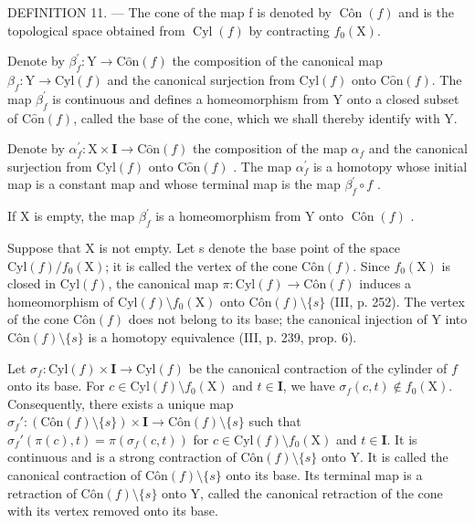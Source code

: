 DEFINITION 11. --- The cone of the map f is denoted by \(\operatorname{Côn}(f)\) and is the topological space obtained from \(\operatorname{Cyl}(f)\) by contracting \(f_{0}(\mathrm{X})\).

Denote by \(\beta_{f}^{\prime}\colon\mathrm{Y}\to\mathrm{C}\hat{\mathrm{o}}\mathrm{n}(f)\) the composition of the canonical map \(\beta_{f}\colon\mathrm{Y}\to\mathrm{C}\mathrm{y}\mathrm{l}(f)\) and the canonical surjection from \(\mathrm{C}\mathrm{y}\mathrm{l}(f)\) onto \(\mathrm{C}\hat{\mathrm{o}}\mathrm{n}(f)\). The map \(\beta_{f}^{\prime}\) is continuous and defines a homeomorphism from Y onto a closed subset of \(\mathrm{C}\hat{\mathrm{o}}\mathrm{n}(f)\), called the base of the cone, which we shall thereby identify with Y.

Denote by \(\alpha_{f}^{\prime}\colon\mathrm{X}\times\mathbf{I}\to\mathrm{C}\hat{\mathrm{o}}\mathrm{n}(f)\) the composition of the map \(\alpha_{f}\) and the canonical surjection from \(\mathrm{Cyl}(f)\) onto \(\mathrm{C}\hat{\mathrm{o}}\mathrm{n}(f)\) . The map \(\alpha_{f}^{\prime}\) is a homotopy whose initial map is a constant map and whose terminal map is the map \(\beta_{f}^{\prime}\circ f\) .

If X is empty, the map \(\beta_{f}^{\prime}\) is a homeomorphism from Y onto \(\operatorname{Côn}(f)\) .

Suppose that X is not empty. Let s denote the base point of the space \(\mathrm{Cyl}(f)/f_{0}(\mathrm{X})\); it is called the vertex of the cone \(\mathrm{Côn}(f)\). Since \(f_{0}(\mathrm{X})\) is closed in \(\mathrm{Cyl}(f)\), the canonical map \(\pi\colon\mathrm{Cyl}(f)\to\mathrm{Côn}(f)\) induces a homeomorphism of \(\mathrm{Cyl}(f)\setminus f_{0}(\mathrm{X})\) onto \(\mathrm{Côn}(f)\setminus\{s\}\) (III, p. 252). The vertex of the cone \(\mathrm{Côn}(f)\) does not belong to its base; the canonical injection of Y into \(\mathrm{Côn}(f)\setminus\{s\}\) is a homotopy equivalence (III, p. 239, prop. 6).

Let \(\sigma_f\colon \mathrm{Cyl}(f)\times \mathbf{I}\to \mathrm{Cyl}(f)\) be the canonical contraction of the cylinder of \(f\) onto its base. For \(c\in \mathrm{Cyl}(f)\setminus f_0(\mathrm{X})\) and \(t\in \mathbf{I}\), we have \(\sigma_f(c,t)\notin f_0(\mathrm{X})\). Consequently, there exists a unique map \(\sigma_f'\colon (\mathrm{Côn}(f)\setminus\{s\})\times \mathbf{I}\to \mathrm{Côn}(f)\setminus\{s\}\) such that \(\sigma_f'(\pi(c),t)=\pi(\sigma_f(c,t))\) for \(c\in \mathrm{Cyl}(f)\setminus f_0(\mathrm{X})\) and \(t\in \mathbf{I}\). It is continuous and is a strong contraction of \(\mathrm{Côn}(f)\setminus\{s\}\) onto Y. It is called the canonical contraction of \(\mathrm{Côn}(f)\setminus\{s\}\) onto its base. Its terminal map is a retraction of \(\mathrm{Côn}(f)\setminus\{s\}\) onto Y, called the canonical retraction of the cone with its vertex removed onto its base.

